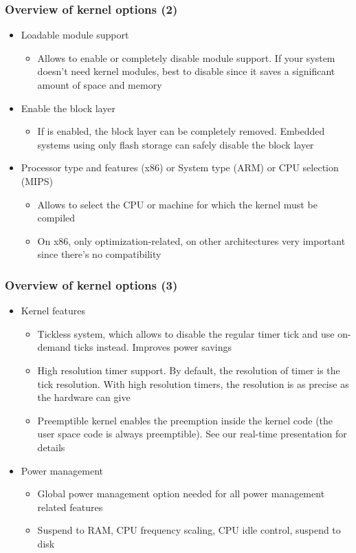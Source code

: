\begin{frame}
  \frametitle{Overview of kernel options (2)}
  \begin{itemize}
  \item Loadable module support
    \begin{itemize}
    \item Allows to enable or completely disable module support. If
      your system doesn't need kernel modules, best to disable since
      it saves a significant amount of space and memory
    \end{itemize}
  \item Enable the block layer
    \begin{itemize}
    \item If  is enabled, the block layer can be
      completely removed. Embedded systems using only flash storage
      can safely disable the block layer
    \end{itemize}
  \item Processor type and features (x86) or System type (ARM) or CPU selection
    (MIPS)
    \begin{itemize}
    \item Allows to select the CPU or machine for which the kernel
      must be compiled
    \item On x86, only optimization-related, on other architectures
      very important since there's no compatibility
    \end{itemize}
  \end{itemize}
\end{frame}

\begin{frame}
  \frametitle{Overview of kernel options (3)}
  \begin{itemize}
  \item Kernel features
    \begin{itemize}
    \item Tickless system, which allows to disable the regular timer
      tick and use on-demand ticks instead. Improves power savings
    \item High resolution timer support. By default, the resolution of
      timer is the tick resolution. With high resolution timers, the
      resolution is as precise as the hardware can give
    \item Preemptible kernel enables the preemption inside the kernel
      code (the user space code is always preemptible). See our
      real-time presentation for details
    \end{itemize}
  \item Power management
    \begin{itemize}
    \item Global power management option needed for all power
      management related features
    \item Suspend to RAM, CPU frequency scaling, CPU idle control,
      suspend to disk
    \end{itemize}
  \end{itemize}
\end{frame}

